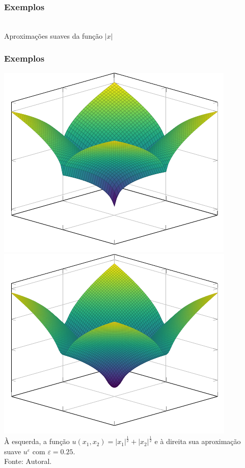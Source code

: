 \documentclass[xcolor=dvipsnames, aspectratio=169, 10pt]{beamer}
\begin{document}
\begin{frame}
    \frametitle{Exemplos}
    \begin{center}
        \\
        Aproximações suaves da função $|x|$
    \end{center}
\end{frame}
\begin{frame}
    \frametitle{Exemplos}
    \begin{center}
        \includegraphics[width=0.4\columnwidth]{../u.pdf}
        \hspace{10mm}
        \includegraphics[width=0.4\columnwidth]{../uε2.pdf}\\
        À esquerda, a função $u(x_1,x_2) = |x_1|^{\frac{1}{2}} + |x_2|^{\frac{1}{2}}$ e à direita sua aproximação\\suave $u^\varepsilon$ com $\varepsilon = 0.25$.\\Fonte: Autoral.
    \end{center}
\end{frame}
\end{document}
